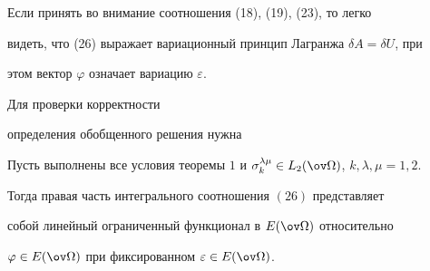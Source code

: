  


Если принять во внимание соотношения (18), (19), (23), то легко 


видеть, что (26) выражает вариационный принцип Лагранжа $\delta A=\delta 


U$, при 


этом вектор $\varphi$ означает вариацию $\varepsilon$. 


 


Для проверки корректности


определения обобщенного решения нужна





 


\begin{lem} 


Пусть выполнены все условия теоремы $1$ и $\sigma^{\lambda\mu}_k\in 


L_2(\ov\Omega)$, $k,\lambda,\mu=1,2$. 


Тогда правая часть интегрального соотношения $(26)$ представляет 


собой линейный ограниченный функционал в $E(\ov\Omega)$ относительно 


$\varphi\in E(\ov\Omega)$ при фиксированном $\varepsilon\in 


E(\ov\Omega)$. 


\end{lem} 





 


